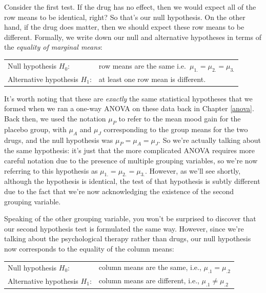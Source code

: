 \documentclass[
  11pt,
  a4paper,
  twoside,symmetric,openright]{book}
\theoremstyle{break}
\theoremstyle{break}
\begin{document}
Consider the first test. If the drug has no effect, then we would expect all of the row means to be identical, right? So that's our null hypothesis. On the other hand, if the drug does matter, then we should expect these row means to be different. Formally, we write down our null and alternative hypotheses in terms of the \emph{equality of marginal means}:

\begin{longtable}[]{@{}
  >{\raggedright\arraybackslash}p{}
  >{\raggedright\arraybackslash}p{}@{}}
\toprule\noalign{}
\endhead
\bottomrule\noalign{}
\endlastfoot
Null hypothesis \(H_0\): & row means are the same i.e.~\(\mu_{1.} = \mu_{2.} = \mu_{3.}\) \\
Alternative hypothesis \(H_1\): & at least one row mean is different. \\
\end{longtable}

It's worth noting that these are \emph{exactly} the same statistical hypotheses that we formed when we ran a one-way ANOVA on these data back in Chapter \ref{anova}. Back then, we used the notation \(\mu_P\) to refer to the mean mood gain for the placebo group, with \(\mu_A\) and \(\mu_J\) corresponding to the group means for the two drugs, and the null hypothesis was \(\mu_P = \mu_A = \mu_J\). So we're actually talking about the same hypothesis: it's just that the more complicated ANOVA requires more careful notation due to the presence of multiple grouping variables, so we're now referring to this hypothesis as \(\mu_{1.} = \mu_{2.} = \mu_{3.}\). However, as we'll see shortly, although the hypothesis is identical, the test of that hypothesis is subtly different due to the fact that we're now acknowledging the existence of the second grouping variable.

Speaking of the other grouping variable, you won't be surprised to discover that our second hypothesis test is formulated the same way. However, since we're talking about the psychological therapy rather than drugs, our null hypothesis now corresponds to the equality of the column means:

\begin{longtable}[]{@{}
  >{\raggedright\arraybackslash}p{}
  >{\raggedright\arraybackslash}p{}@{}}
\toprule\noalign{}
\endhead
\bottomrule\noalign{}
\endlastfoot
Null hypothesis \(H_0\): & column means are the same, i.e., \(\mu_{.1} = \mu_{.2}\) \\
Alternative hypothesis \(H_1\): & column means are different, i.e., \(\mu_{.1} \neq \mu_{.2}\) \\
\end{longtable}
\end{document}
